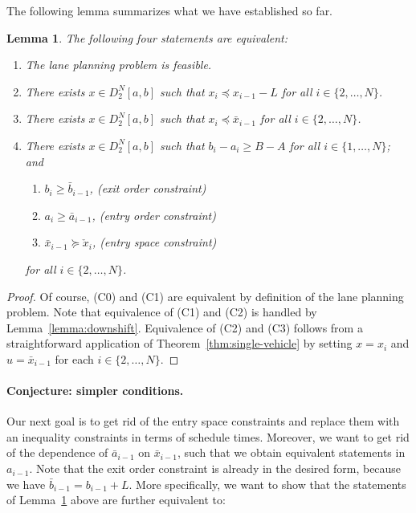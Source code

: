 \documentclass[a4paper]{report}
\theoremstyle{definition}
\theoremstyle{plain}
\newtheorem{lemma}{Lemma}[chapter]
\begin{document}
%
The following lemma summarizes what we have established so far.

\begin{lemma}\label{lemma:summary}
  The following four statements are equivalent:

  \begin{enumerate}[leftmargin=3em]
    \item[(C0)] The lane planning problem is feasible.
    \item[(C1)] There exists $x \in D_{2}^{N}[a, b]$ such that $x_{i} \preceq x_{i-1} - L$ for all $i \in \{2, \dots, N\}$.
    \item[(C2)] There exists $x \in D_{2}^{N}[a, b]$ such that $x_{i} \preceq \bar{x}_{i-1}$ for all $i \in \{2, \dots, N\}$.

    \item[(C3)] There exists $x \in D_{2}^{N}[a, b]$ such that
          $b_{i} - a_{i} \geq B - A$ for all $i \in \{1, \dots, N\}$; and
    \TabPositions{2cm}
    \begin{enumerate}[label=(\roman*)\quad,leftmargin=3em,midpenalty=10]
      \item $b_{i} \geq \bar{b}_{i-1}$, \tab (exit order constraint)
      \item $a_{i} \geq \bar{a}_{i-1}$, \tab (entry order constraint)
      \item $\bar{x}_{i-1} \succeq \check{x}_{i}$, \tab (entry space constraint)
    \end{enumerate}
    for all $i \in \{2, \dots, N\}$.

  \end{enumerate}
\end{lemma}
\begin{proof}
  Of course, (C0) and (C1) are equivalent by definition of the lane planning
  problem. Note that equivalence of (C1) and (C2) is handled by Lemma~\ref{lemma:downshift}.
  Equivalence of (C2) and (C3) follows from a straightforward application of
  Theorem~\ref{thm:single-vehicle} by setting $x=x_i$ and $u=\bar{x}_{i-1}$ for
  each $i \in \{2, \dots, N\}$.
\end{proof}

\paragraph{Conjecture: simpler conditions.}
Our next goal is to get rid of the entry space constraints and replace them
with an inequality constraints in terms of schedule times.
%
Moreover, we want to get rid of the dependence of $\bar{a}_{i-1}$ on
$\bar{x}_{i-1}$, such that we obtain equivalent statements in $a_{i-1}$. Note
that the exit order constraint is already in the desired form, because we have
$\bar{b}_{i-1} = b_{i-1} + L$.
%
More specifically, we want to show that the statements of
Lemma~\ref{lemma:summary} above are further equivalent to:
\end{document}
